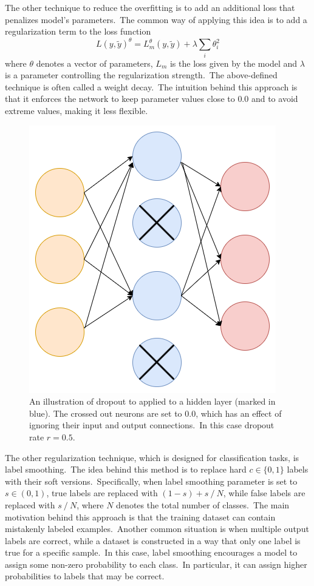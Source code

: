 \documentclass[longabstract, english, mgr]{iithesis}
\theoremstyle{default_theorem_style}\newtheorem{theorem}{Theorem}
\theoremstyle{default_theorem_style}\newtheorem{definition}{Definition}
\begin{document}
\noindent The other technique to reduce the overfitting is to add an additional loss that penalizes model's
parameters.\ The common way of applying this idea is to add a regularization term to the loss function
$$
L(y, \tilde{y})^{\theta} = L_m^{\theta}(y, \tilde{y}) + \lambda \sum_i \theta_i^2
$$
where $\theta$ denotes a vector of parameters, $L_m$ is the loss given by the model and $\lambda$ is a parameter
controlling the regularization strength.\ The above-defined technique is often called a weight decay.\ The intuition
behind this approach is that it enforces the network to keep parameter values close to $0.0$ and to avoid extreme
values, making it less flexible.\newline

\begin{figure}[t]
\centering
\includegraphics[scale=0.42]{dropout}
\caption{An illustration of dropout to applied to a hidden layer (marked in blue). The crossed out neurons are set
to $0.0$, which has an effect of ignoring their input and output connections.\ In this case dropout rate $r = 0.5$.}
\label{fig:dropout}
\end{figure}

\noindent The other regularization technique, which is designed for classification tasks, is label
smoothing.\ The idea behind this method is to replace hard $c \in \{0, 1\}$ labels with their soft
versions.\ Specifically, when label smoothing parameter is set to $s \in (0, 1)$, true labels are replaced with
$(1 - s) + s\ /\ N$, while false labels are replaced with $s\ /\ N$, where $N$ denotes the total number of
classes.\ The main motivation behind this approach is that the training dataset can contain mistakenly labeled
examples.\ Another common situation is when multiple output labels are correct, while a dataset is constructed in a way
that only one label is true for a specific sample.\ In this case, label smoothing encourages a model to assign some
non-zero probability to each class.\ In particular, it can assign higher probabilities to labels that may be correct.
\end{document}
